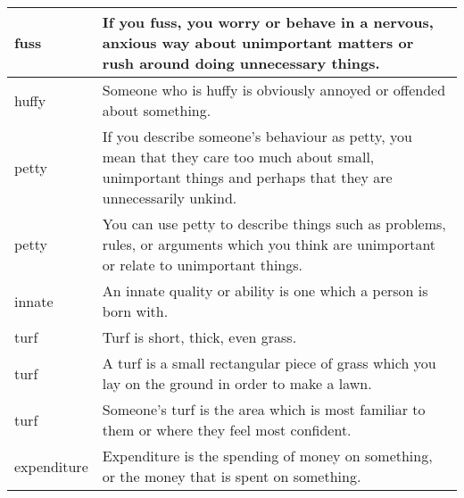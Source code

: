 \documentclass{article}
\begin{document}
\begin{center}
\begin{longtable}{|l|p{7.8cm}|}
\hline
fuss
&
If you fuss, you worry or behave in a nervous, anxious way about unimportant matters or rush around doing unnecessary things.
\\

\hline
huffy
&
Someone who is huffy is obviously annoyed or offended about something.
\\

\hline
petty
&
If you describe someone's behaviour as petty, you mean that they care too much about small, unimportant things and perhaps that they are unnecessarily unkind.
\\

\hline
petty
&
You can use petty to describe things such as problems, rules, or arguments which you think are unimportant or relate to unimportant things.
\\

\hline
innate
&
An innate quality or ability is one which a person is born with.
\\

\hline
turf
&
Turf is short, thick, even grass.
\\

\hline
turf
&
A turf is a small rectangular piece of grass which you lay on the ground in order to make a lawn.
\\

\hline
turf
&
Someone's turf is the area which is most familiar to them or where they feel most confident.
\\

\hline
expenditure
&
Expenditure is the spending of money on something, or the money that is spent on something.
\\

\hline

\end{longtable}
\end{center}
\end{document}

